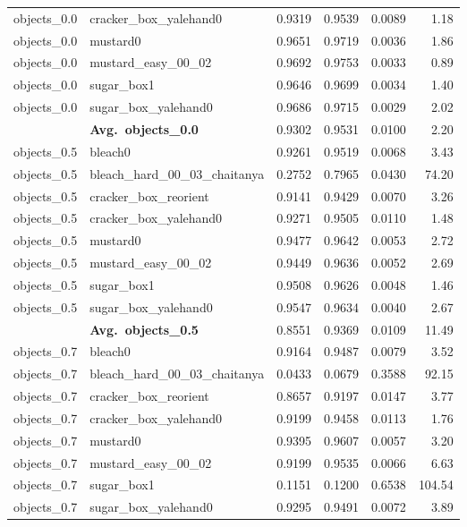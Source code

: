 \begin{longtable}{llrrrr}
  objects_0.0 & cracker\_box\_yalehand0 & 0.9319 & 0.9539 & 0.0089 & 1.18 \\
  objects_0.0 & mustard0 & 0.9651 & 0.9719 & 0.0036 & 1.86 \\
  objects_0.0 & mustard\_easy\_00\_02 & 0.9692 & 0.9753 & 0.0033 & 0.89 \\
  objects_0.0 & sugar\_box1 & 0.9646 & 0.9699 & 0.0034 & 1.40 \\
  objects_0.0 & sugar\_box\_yalehand0 & 0.9686 & 0.9715 & 0.0029 & 2.02 \\
  \cmidrule{2-6}
  & \textbf{Avg.~objects_0.0} & 0.9302 & 0.9531 & 0.0100 & 2.20 \\
  \midrule
  objects_0.5 & bleach0 & 0.9261 & 0.9519 & 0.0068 & 3.43 \\
  objects_0.5 & bleach\_hard\_00\_03\_chaitanya & 0.2752 & 0.7965 & 0.0430 & 74.20 \\
  objects_0.5 & cracker\_box\_reorient & 0.9141 & 0.9429 & 0.0070 & 3.26 \\
  objects_0.5 & cracker\_box\_yalehand0 & 0.9271 & 0.9505 & 0.0110 & 1.48 \\
  objects_0.5 & mustard0 & 0.9477 & 0.9642 & 0.0053 & 2.72 \\
  objects_0.5 & mustard\_easy\_00\_02 & 0.9449 & 0.9636 & 0.0052 & 2.69 \\
  objects_0.5 & sugar\_box1 & 0.9508 & 0.9626 & 0.0048 & 1.46 \\
  objects_0.5 & sugar\_box\_yalehand0 & 0.9547 & 0.9634 & 0.0040 & 2.67 \\
  \cmidrule{2-6}
  & \textbf{Avg.~objects_0.5} & 0.8551 & 0.9369 & 0.0109 & 11.49 \\
  \midrule
  objects_0.7 & bleach0 & 0.9164 & 0.9487 & 0.0079 & 3.52 \\
  objects_0.7 & bleach\_hard\_00\_03\_chaitanya & 0.0433 & 0.0679 & 0.3588 & 92.15 \\
  objects_0.7 & cracker\_box\_reorient & 0.8657 & 0.9197 & 0.0147 & 3.77 \\
  objects_0.7 & cracker\_box\_yalehand0 & 0.9199 & 0.9458 & 0.0113 & 1.76 \\
  objects_0.7 & mustard0 & 0.9395 & 0.9607 & 0.0057 & 3.20 \\
  objects_0.7 & mustard\_easy\_00\_02 & 0.9199 & 0.9535 & 0.0066 & 6.63 \\
  objects_0.7 & sugar\_box1 & 0.1151 & 0.1200 & 0.6538 & 104.54 \\
  objects_0.7 & sugar\_box\_yalehand0 & 0.9295 & 0.9491 & 0.0072 & 3.89 \\

\end{longtable}
